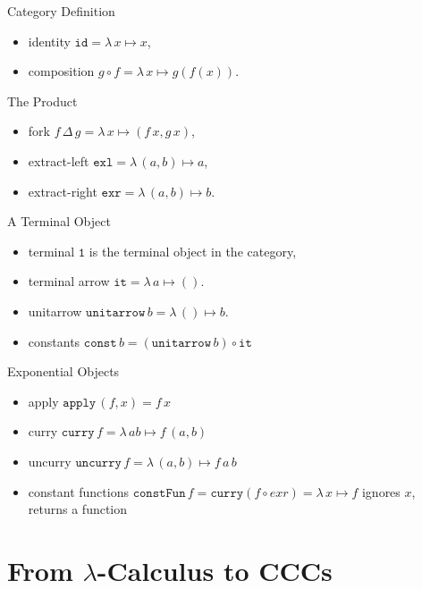 \documentclass[10pt]{beamer}
\newcommand{\id}{\mathtt{id}}
\newcommand{\apply}{\mathtt{apply}}
\newcommand{\curry}{\mathtt{curry}}
\newcommand{\uncurry}{\mathtt{uncurry}}
\newcommand{\exl}{\mathtt{exl}}
\newcommand{\exr}{\mathtt{exr}}
\newcommand{\termin}{\mathtt{1}}
\newcommand{\termarr}{\mathtt{it}}
\newcommand{\unitarrow}{\ensuremath{\mathtt{unitarrow}}}
\newcommand{\lamf}[2]{\ensuremath{\lambda\, #1 \mapsto #2}}
\newcommand{\delprod}[2]{\ensuremath{#1\,\Delta\,#2}}
\newcommand{\const}{\ensuremath{\mathtt{const}}}
\newcommand{\constFun}{\ensuremath{\mathtt{constFun}}}
\theoremstyle{definition}
\theoremstyle{remark}
\numberwithin{equation}{section}
\begin{document}
\begin{frame}[fragile]{Category Definition}
  \begin{itemize}
  \item identity $\id = \lamf{x}{x} $,
  \item composition $g \circ f = \lamf{x}{g(f(x))}$.
  \end{itemize}
\end{frame}

\begin{frame}[fragile]{The Product}
  \begin{itemize}
  \item fork $\delprod{f}{g} = \lamf{x}{(f\,x,g\,x)}$,
  \item extract-left $\exl = \lamf{(a,b)}{a}$,
  \item extract-right $\exr = \lamf{(a,b)}{b}$.
  \end{itemize}
\end{frame}

\begin{frame}[fragile]{A Terminal Object}
  \begin{itemize}
  \item terminal $\termin$ is the terminal object in the category,
  \item terminal arrow $\termarr = \lamf{a}{()}$.
  \item unitarrow $\unitarrow\, b = \lamf{()}{b}$.
  \item constants $\const\, b = (\unitarrow\, b) \circ \termarr$
  \end{itemize}
\end{frame}

\begin{frame}[fragile]{Exponential Objects}
  \begin{itemize}
  \item apply $\apply\, (f,x) = f\,x$
  \item curry $\curry\, f = \lamf{a b}{f\,(a,b)}$
  \item uncurry $\uncurry\, f = \lamf{(a,b)}{f\,a\,b}$
  \item constant functions $\constFun\, f = \curry (f \circ exr) = \lamf{x}{f}$ ignores $x$, returns a function
  \end{itemize}
\end{frame}

\section{From $\lambda$-Calculus to CCCs}
\end{document}
